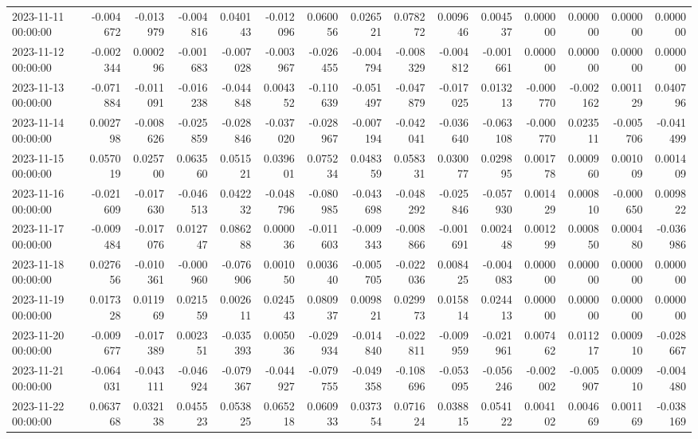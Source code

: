\begin{tabular}{lrrrrrrrrrrrrrr}
2023-11-11 00:00:00 & -0.004672 & -0.013979 & -0.004816 & 0.040143 & -0.012096 & 0.060056 & 0.026521 & 0.078272 & 0.009646 & 0.004537 & 0.000000 & 0.000000 & 0.000000 & 0.000000 \\
2023-11-12 00:00:00 & -0.002344 & 0.000296 & -0.001683 & -0.007028 & -0.003967 & -0.026455 & -0.004794 & -0.008329 & -0.004812 & -0.001661 & 0.000000 & 0.000000 & 0.000000 & 0.000000 \\
2023-11-13 00:00:00 & -0.071884 & -0.011091 & -0.016238 & -0.044848 & 0.004352 & -0.110639 & -0.051497 & -0.047879 & -0.017025 & 0.013213 & -0.000770 & -0.002162 & 0.001129 & 0.040796 \\
2023-11-14 00:00:00 & 0.002798 & -0.008626 & -0.025859 & -0.028846 & -0.037020 & -0.028967 & -0.007194 & -0.042041 & -0.036640 & -0.063108 & -0.000770 & 0.023511 & -0.005706 & -0.041499 \\
2023-11-15 00:00:00 & 0.057019 & 0.025700 & 0.063560 & 0.051521 & 0.039601 & 0.075234 & 0.048359 & 0.058331 & 0.030077 & 0.029895 & 0.001778 & 0.000960 & 0.001009 & 0.001409 \\
2023-11-16 00:00:00 & -0.021609 & -0.017630 & -0.046513 & 0.042232 & -0.048796 & -0.080985 & -0.043698 & -0.048292 & -0.025846 & -0.057930 & 0.001429 & 0.000810 & -0.000650 & 0.009822 \\
2023-11-17 00:00:00 & -0.009484 & -0.017076 & 0.012747 & 0.086288 & 0.000036 & -0.011603 & -0.009343 & -0.008866 & -0.001691 & 0.002448 & 0.001299 & 0.000850 & 0.000480 & -0.036986 \\
2023-11-18 00:00:00 & 0.027656 & -0.010361 & -0.000960 & -0.076906 & 0.001050 & 0.003640 & -0.005705 & -0.022036 & 0.008425 & -0.004083 & 0.000000 & 0.000000 & 0.000000 & 0.000000 \\
2023-11-19 00:00:00 & 0.017328 & 0.011969 & 0.021559 & 0.002611 & 0.024543 & 0.080937 & 0.009821 & 0.029973 & 0.015814 & 0.024413 & 0.000000 & 0.000000 & 0.000000 & 0.000000 \\
2023-11-20 00:00:00 & -0.009677 & -0.017389 & 0.002351 & -0.035393 & 0.005036 & -0.029934 & -0.014840 & -0.022811 & -0.009959 & -0.021961 & 0.007462 & 0.011217 & 0.000910 & -0.028667 \\
2023-11-21 00:00:00 & -0.064031 & -0.043111 & -0.046924 & -0.079367 & -0.044927 & -0.079755 & -0.049358 & -0.108696 & -0.053095 & -0.056246 & -0.002002 & -0.005907 & 0.000910 & -0.004480 \\
2023-11-22 00:00:00 & 0.063768 & 0.032138 & 0.045523 & 0.053825 & 0.065218 & 0.060933 & 0.037354 & 0.071624 & 0.038815 & 0.054122 & 0.004102 & 0.004669 & 0.001169 & -0.038169 \\

\end{tabular}
